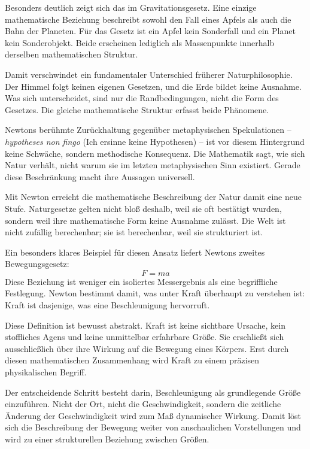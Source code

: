 Besonders deutlich zeigt sich das im Gravitationsgesetz.
Eine einzige mathematische Beziehung
beschreibt sowohl den Fall eines Apfels
als auch die Bahn der Planeten.
Für das Gesetz ist ein Apfel kein Sonderfall
und ein Planet kein Sonderobjekt.
Beide erscheinen lediglich als Massenpunkte
innerhalb derselben mathematischen Struktur.

Damit verschwindet ein fundamentaler Unterschied früherer Naturphilosophie.
Der Himmel folgt keinen eigenen Gesetzen,
und die Erde bildet keine Ausnahme.
Was sich unterscheidet,
sind nur die Randbedingungen,
nicht die Form des Gesetzes.
Die gleiche mathematische Struktur erfasst beide Phänomene.

Newtons berühmte Zurückhaltung gegenüber metaphysischen Spekulationen --
\emph{hypotheses non fingo}
(\glqq Ich ersinne keine Hypothesen\grqq) --
ist vor diesem Hintergrund keine Schwäche,
sondern methodische Konsequenz.
Die Mathematik sagt,
wie sich Natur verhält,
nicht warum sie im letzten metaphysischen Sinn existiert.
Gerade diese Beschränkung macht ihre Aussagen universell.

Mit Newton erreicht die mathematische Beschreibung der Natur
damit eine neue Stufe.
Naturgesetze gelten nicht bloß deshalb,
weil sie oft bestätigt wurden,
sondern weil ihre mathematische Form
keine Ausnahme zulässt.
Die Welt ist nicht zufällig berechenbar;
sie ist berechenbar,
weil sie strukturiert ist.

Ein besonders klares Beispiel für diesen Ansatz
liefert Newtons zweites Bewegungsgesetz:
\[
F = m a
\]
Diese Beziehung ist weniger ein isoliertes Messergebnis
als eine begriffliche Festlegung.
Newton bestimmt damit,
was unter Kraft überhaupt zu verstehen ist:
Kraft ist dasjenige,
was eine Beschleunigung hervorruft.

Diese Definition ist bewusst abstrakt.
Kraft ist keine sichtbare Ursache,
kein stoffliches Agens
und keine unmittelbar erfahrbare Größe.
Sie erschließt sich ausschließlich über ihre Wirkung
auf die Bewegung eines Körpers.
Erst durch diesen mathematischen Zusammenhang
wird Kraft zu einem präzisen physikalischen Begriff.

Der entscheidende Schritt besteht darin,
Beschleunigung als grundlegende Größe einzuführen.
Nicht der Ort,
nicht die Geschwindigkeit,
sondern die zeitliche Änderung der Geschwindigkeit
wird zum Maß dynamischer Wirkung.
Damit löst sich die Beschreibung der Bewegung
weiter von anschaulichen Vorstellungen
und wird zu einer strukturellen Beziehung zwischen Größen.

